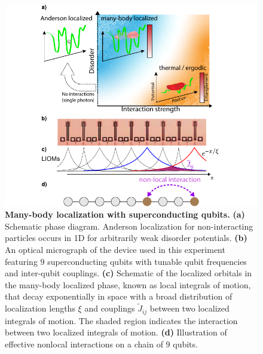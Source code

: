 \begin{figure}[t]
    \hspace*{-25pt}
    \includegraphics[width=4.5 in,keepaspectratio]{./PDF/f1_190716_1106a.pdf}
    \caption{\small
    \textbf{Many-body localization with superconducting qubits.}
    \textbf{(a)} Schematic phase diagram.
    Anderson localization for non-interacting particles occurs in 1D for arbitrarily weak disorder potentials.
    \textbf{(b)} An optical micrograph of the device used in this experiment featuring $9$ superconducting qubits with tunable qubit frequencies and inter-qubit couplings.
    \textbf{(c)} Schematic of the localized orbitals in the many-body localized phase, known as local integrals of motion, that decay exponentially in space with a broad distribution of localization lengths $\xi$ and couplings $\widetilde{J}_{ij}$ between two localized integrals of motion.
    The shaded region indicates the interaction between two localized integrals of motion.
    \textbf{(d)} Illustration of effective nonlocal interactions on a chain of $9$ qubits.
    }
    \label{fig_1}
\end{figure}

